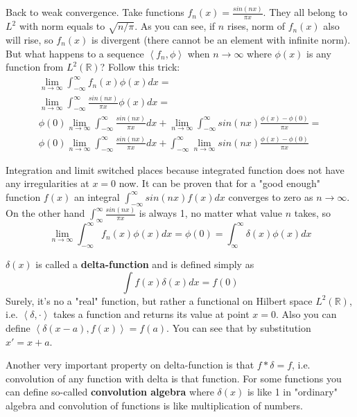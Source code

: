 \documentclass[a4paper,11pt,fleqn]{article}
\begin{document}
Back to weak convergence. Take functions $f_{n}(x) = \frac{sin(nx)}{\pi x}$. They all belong to $L^2$ with norm equals to $\sqrt{n/\pi}$. As you can see, if
$n$ rises, norm of $f_{n}(x)$ also will rise, so $f_{n}(x)$ is divergent (there cannot be an element with infinite norm). But what happens to a sequence
$\left<f_{n},\phi\right>$ when $n \to \infty$ where $\phi(x)$ is any function from $L^2(\mathbb{R})$? Follow this trick:
\begin{equation}
\begin{aligned}
\lim_{n \to \infty} \int_{-\infty}^{\infty} f_{n}(x)\phi(x)dx = \\
\lim_{n \to \infty} \int_{-\infty}^{\infty} \frac{sin(nx)}{\pi x}\phi(x)dx = \\
\phi(0) \lim_{n \to \infty} \int_{-\infty}^{\infty} \frac{sin(nx)}{\pi x} dx + \lim_{n \to \infty} \int_{-\infty}^{\infty} sin(nx) \frac{\phi(x) - \phi(0)}{\pi x} = \\
\phi(0) \lim_{n \to \infty} \int_{-\infty}^{\infty} \frac{sin(nx)}{\pi x} dx + \int_{-\infty}^{\infty} \lim_{n \to \infty} sin(nx) \frac{\phi(x) - \phi(0)}{\pi x}
\end{aligned}
\end{equation}

Integration and limit switched places because integrated function does not have any irregularities at $x=0$ now. It can be proven that for a "good enough" function $f(x)$
an integral $\int_{-\infty}^{\infty} sin(nx) f(x)dx$ converges to zero as $n \to \infty$. On the other hand $\int_{\infty}^{\infty} \frac{sin(nx)}{\pi x}$ is always 1,
no matter what value $n$ takes, so
\begin{equation}
\lim_{n \to \infty} \int_{-\infty}^{\infty} f_{n}(x)\phi(x)dx = \phi(0) = \int_{\infty}^{\infty} \delta(x)\phi(x)dx
\end{equation}

$\delta(x)$ is called a \textbf{delta-function} and is defined simply as
\begin{equation}
\int f(x)\delta(x) dx = f(0)
\end{equation}
Surely, it's no a "real" function, but rather a functional on Hilbert space $L^{2}(\mathbb{R})$, i.e. $\left<\delta,\cdot\right>$ takes a function and returns its value
at point $x=0$. Also you can define $\left<\delta(x-a),f(x)\right> = f(a)$. You can see that by substitution $x' = x+a$.

Another very important property on delta-function is that $f*\delta = f$, i.e. convolution of any function with delta is that function. For some functions you can define
so-called \textbf{convolution algebra} where $\delta(x)$ is like 1 in "ordinary" algebra and convolution of functions is like multiplication of numbers.
\end{document}
